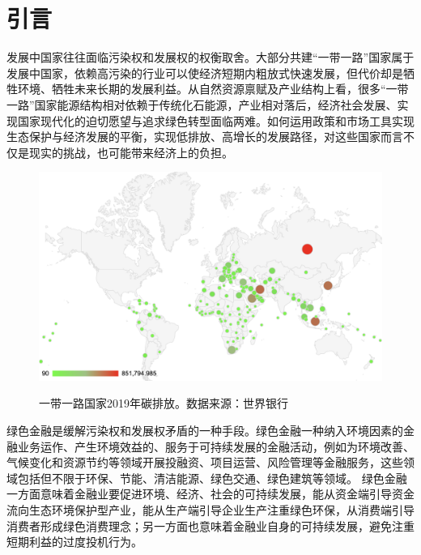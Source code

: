 \section*{引言}

发展中国家往往面临污染权和发展权的权衡取舍\cite{曾文革2012从碳排放权之争看我国在气候变化上的法律应对}。大部分共建“一带一路”国家属于发展中国家，依赖高污染的行业可以使经济短期内粗放式快速发展，但代价却是牺牲环境、牺牲未来长期的发展利益。从自然资源禀赋及产业结构上看，很多“一带一路”国家能源结构相对依赖于传统化石能源，产业相对落后，经济社会发展、实现国家现代化的迫切愿望与追求绿色转型面临两难。如何运用政策和市场工具实现生态保护与经济发展的平衡，实现低排放、高增长的发展路径，对这些国家而言不仅是现实的挑战，也可能带来经济上的负担。
\begin{figure}[H]
    \centering
    \includegraphics[width=0.8\linewidth]{./img/碳排放.png}
    \label{fig:carbonemit}
    \caption{一带一路国家2019年碳排放。数据来源：世界银行}
\end{figure}

绿色金融是缓解污染权和发展权矛盾的一种手段。绿色金融一种纳入环境因素的金融业务运作、产生环境效益的、服务于可持续发展的金融活动，例如为环境改善、气候变化和资源节约等领域开展投融资、项目运营、风险管理等金融服务，这些领域包括但不限于环保、节能、清洁能源、绿色交通、绿色建筑等领域。
绿色金融一方面意味着金融业要促进环境、经济、社会的可持续发展，能从资金端引导资金流向生态环境保护型产业，能从生产端引导企业生产注重绿色环保，从消费端引导消费者形成绿色消费理念；另一方面也意味着金融业自身的可持续发展，避免注重短期利益的过度投机行为。

